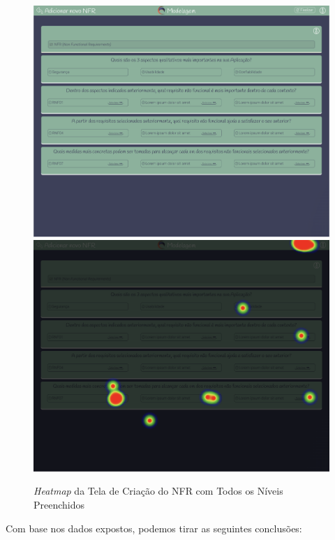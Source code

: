 \begin{figure}[]
  \begin{center}
      \caption{{\textit{Heatmap} da Tela de Criação do NFR com Todos os Níveis Preenchidos}}
      \label{fig:nfr_hm_5}
      \includegraphics[scale=0.45]{figuras/UsabilityHub/nfr/9.png}
      \includegraphics[scale=0.45]{figuras/UsabilityHub/nfr/10.png}
  \end{center}
\end{figure}


Com base nos dados expostos, podemos tirar as seguintes conclusões:

